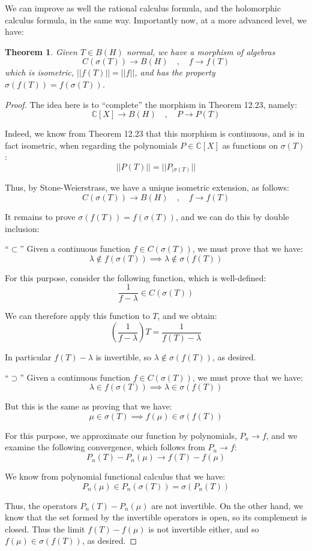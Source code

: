 \documentclass[12pt]{amsbook}
\newtheorem{theorem}{Theorem}[chapter]
\begin{document}
We can improve as well the rational calculus formula, and the holomorphic calculus formula, in the same way. Importantly now, at a more advanced level, we have:


\begin{theorem}
Given $T\in B(H)$ normal, we have a morphism of algebras
$$C(\sigma(T))\to B(H)\quad,\quad 
f\to f(T)$$
which is isometric, $||f(T)||=||f||$, and has the property $\sigma(f(T))=f(\sigma(T))$.
\end{theorem}

\begin{proof}
The idea here is to ``complete'' the morphism in Theorem 12.23, namely:
$$\mathbb C[X]\to B(H)\quad,\quad 
P\to P(T)$$

Indeed, we know from Theorem 12.23 that this morphism is continuous, and is in fact isometric, when regarding the polynomials $P\in\mathbb C[X]$ as functions on $\sigma(T)$:
$$||P(T)||=||P_{|\sigma(T)}||$$

Thus, by Stone-Weierstrass, we have a unique isometric extension, as follows:
$$C(\sigma(T))\to B(H)\quad,\quad  
f\to f(T)$$

It remains to prove $\sigma(f(T))=f(\sigma(T))$, and we can do this by double inclusion:

\medskip

``$\subset$'' Given a continuous function $f\in C(\sigma(T))$, we must prove that we have:
$$\lambda\notin f(\sigma(T))\implies\lambda\notin\sigma(f(T))$$

For this purpose, consider the following function, which is well-defined:
$$\frac{1}{f-\lambda}\in C(\sigma(T))$$

We can therefore apply this function to $T$, and we obtain:
$$\left(\frac{1}{f-\lambda}\right)T=\frac{1}{f(T)-\lambda}$$

In particular $f(T)-\lambda$ is invertible, so  $\lambda\notin\sigma(f(T))$, as desired.

\medskip

``$\supset$'' Given a continuous function $f\in C(\sigma(T))$, we must prove that we have: 
$$\lambda\in f(\sigma(T))\implies\lambda\in\sigma(f(T))$$

But this is the same as proving that we have:
$$\mu\in\sigma(T)\implies f(\mu)\in\sigma(f(T))$$

For this purpose, we approximate our function by polynomials, $P_n\to f$, and we examine the following convergence, which follows from $P_n\to f$:
$$P_n(T)-P_n(\mu)\to f(T)-f(\mu)$$

We know from polynomial functional calculus that we have:
$$P_n(\mu)
\in P_n(\sigma(T))
=\sigma(P_n(T))$$

Thus, the operators $P_n(T)-P_n(\mu)$ are not invertible. On the other hand, we know that the set formed by the invertible operators is open, so its complement is closed. Thus the limit $f(T)-f(\mu)$ is not invertible either, and so $f(\mu)\in\sigma(f(T))$, as desired.
\end{proof}
\end{document}
